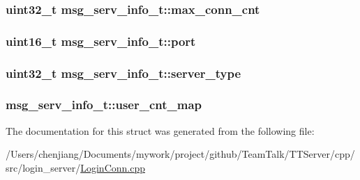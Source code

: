 \subsubsection[{max\+\_\+conn\+\_\+cnt}]{\setlength{\rightskip}{0pt plus 5cm}uint32\+\_\+t msg\+\_\+serv\+\_\+info\+\_\+t\+::max\+\_\+conn\+\_\+cnt}\label{structmsg__serv__info__t_adbed9967db16aadb67f710feda1ba51a}
\hypertarget{structmsg__serv__info__t_aec8d7099ad41227d5407b2893dfaa96d}{}
\subsubsection[{port}]{\setlength{\rightskip}{0pt plus 5cm}uint16\+\_\+t msg\+\_\+serv\+\_\+info\+\_\+t\+::port}\label{structmsg__serv__info__t_aec8d7099ad41227d5407b2893dfaa96d}
\hypertarget{structmsg__serv__info__t_aba9d9c51de73ca23dec4bd78b3134762}{}
\subsubsection[{server\+\_\+type}]{\setlength{\rightskip}{0pt plus 5cm}uint32\+\_\+t msg\+\_\+serv\+\_\+info\+\_\+t\+::server\+\_\+type}\label{structmsg__serv__info__t_aba9d9c51de73ca23dec4bd78b3134762}
\hypertarget{structmsg__serv__info__t_ae0cadf76671bcbe776fd5c530717530d}{}
\subsubsection[{user\+\_\+cnt\+\_\+map}]{ msg\+\_\+serv\+\_\+info\+\_\+t\+::user\+\_\+cnt\+\_\+map}\label{structmsg__serv__info__t_ae0cadf76671bcbe776fd5c530717530d}


The documentation for this struct was generated from the following file\+:\begin{DoxyCompactItemize}
\item 
/\+Users/chenjiang/\+Documents/mywork/project/github/\+Team\+Talk/\+T\+T\+Server/cpp/src/login\+\_\+server/\hyperlink{_login_conn_8cpp}{Login\+Conn.\+cpp}\end{DoxyCompactItemize}
